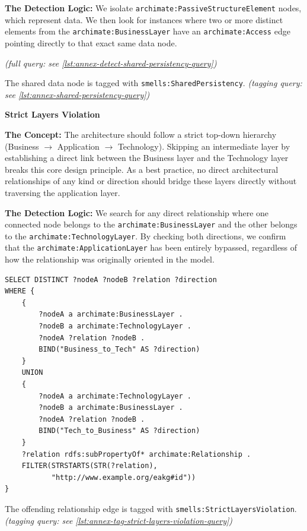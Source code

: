 \textbf{The Detection Logic:} We isolate \texttt{archimate:PassiveStructureElement} nodes, which represent data. We then look for instances where two or more distinct elements from the \texttt{archimate:BusinessLayer} have an \texttt{archimate:Access} edge pointing directly to that exact same data node.

\textit{(full query: see \autoref{lst:annex-detect-shared-persistency-query})}

The shared data node is tagged with \texttt{smells:SharedPersistency}. \textit{(tagging query: see \autoref{lst:annex-shared-persistency-query})}

\noindent\textbf{Strict Layers Violation}\par

\textbf{The Concept:} The architecture should follow a strict top-down hierarchy (Business $\rightarrow$ Application $\rightarrow$ Technology). Skipping an intermediate layer by establishing a direct link between the Business layer and the Technology layer breaks this core design principle. As a best practice, no direct architectural relationships of any kind or direction should bridge these layers directly without traversing the application layer.

\textbf{The Detection Logic:} We search for any direct relationship where one connected node belongs to the \texttt{archimate:BusinessLayer} and the other belongs to the \texttt{archimate:TechnologyLayer}. By checking both directions, we confirm that the \texttt{archimate:ApplicationLayer} has been entirely bypassed, regardless of how the relationship was originally oriented in the model.

\begin{lstlisting}[caption={Detect strict layers violation}]
SELECT DISTINCT ?nodeA ?nodeB ?relation ?direction
WHERE {
    {
        ?nodeA a archimate:BusinessLayer .
        ?nodeB a archimate:TechnologyLayer .
        ?nodeA ?relation ?nodeB .
        BIND("Business_to_Tech" AS ?direction)
    }
    UNION
    {
        ?nodeA a archimate:TechnologyLayer .
        ?nodeB a archimate:BusinessLayer .
        ?nodeA ?relation ?nodeB .
        BIND("Tech_to_Business" AS ?direction)
    }
    ?relation rdfs:subPropertyOf* archimate:Relationship .
    FILTER(STRSTARTS(STR(?relation),
           "http://www.example.org/eakg#id"))
}
\end{lstlisting}

The offending relationship edge is tagged with \texttt{smells:StrictLayersViolation}. \textit{(tagging query: see \autoref{lst:annex-tag-strict-layers-violation-query})}

